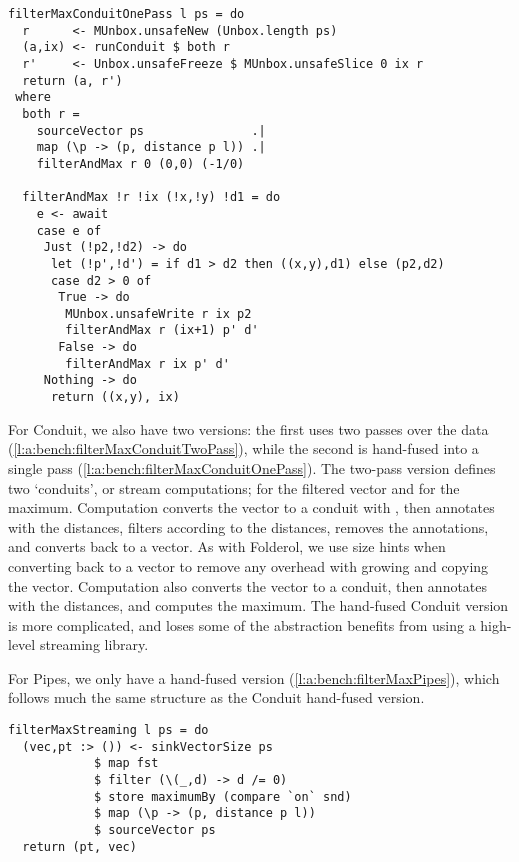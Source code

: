 \begin{lstlisting}[float,label=l:a:bench:filterMaxConduitOnePass,caption=Conduit one-pass (hand-fused) implementation of \Hs/filterMax/]
filterMaxConduitOnePass l ps = do
  r      <- MUnbox.unsafeNew (Unbox.length ps)
  (a,ix) <- runConduit $ both r
  r'     <- Unbox.unsafeFreeze $ MUnbox.unsafeSlice 0 ix r
  return (a, r')
 where
  both r =
    sourceVector ps               .|
    map (\p -> (p, distance p l)) .|
    filterAndMax r 0 (0,0) (-1/0)

  filterAndMax !r !ix (!x,!y) !d1 = do
    e <- await
    case e of
     Just (!p2,!d2) -> do
      let (!p',!d') = if d1 > d2 then ((x,y),d1) else (p2,d2)
      case d2 > 0 of
       True -> do
        MUnbox.unsafeWrite r ix p2
        filterAndMax r (ix+1) p' d'
       False -> do
        filterAndMax r ix p' d'
     Nothing -> do
      return ((x,y), ix)
\end{lstlisting}

For Conduit, we also have two versions: the first uses two passes over the data (\cref{l:a:bench:filterMaxConduitTwoPass}), while the second is hand-fused into a single pass (\cref{l:a:bench:filterMaxConduitOnePass}).
The two-pass version defines two `conduits', or stream computations; \Hs@cabove@ for the filtered vector and \Hs@cmaxim@ for the maximum.
Computation \Hs@cabove@ converts the vector to a conduit with \Hs@sourceVector@, then annotates with the distances, filters according to the distances, removes the annotations, and converts back to a vector.
As with Folderol, we use size hints when converting back to a vector to remove any overhead with growing and copying the vector.
Computation \Hs@cmaxim@ also converts the vector to a conduit, then annotates with the distances, and computes the maximum.
The hand-fused Conduit version is more complicated, and loses some of the abstraction benefits from using a high-level streaming library.

For Pipes, we only have a hand-fused version (\cref{l:a:bench:filterMaxPipes}), which follows much the same structure as the Conduit hand-fused version.

\begin{lstlisting}[float,label=l:a:bench:filterMaxStreaming,caption=Streaming implementation of \Hs/filterMax/]
filterMaxStreaming l ps = do
  (vec,pt :> ()) <- sinkVectorSize ps
            $ map fst
            $ filter (\(_,d) -> d /= 0)
            $ store maximumBy (compare `on` snd)
            $ map (\p -> (p, distance p l))
            $ sourceVector ps
  return (pt, vec)
\end{lstlisting}


